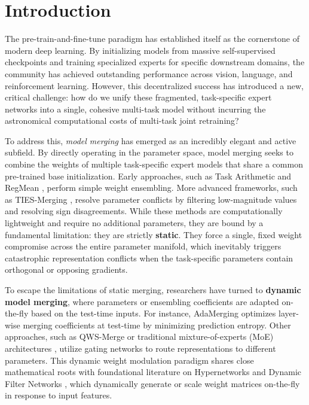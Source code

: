 \section{Introduction}
\label{sec:intro}

The pre-train-and-fine-tune paradigm has established itself as the cornerstone of modern deep learning. By initializing models from massive self-supervised checkpoints and training specialized experts for specific downstream domains, the community has achieved outstanding performance across vision, language, and reinforcement learning. However, this decentralized success has introduced a new, critical challenge: how do we unify these fragmented, task-specific expert networks into a single, cohesive multi-task model without incurring the astronomical computational costs of multi-task joint retraining?

To address this, \emph{model merging} has emerged as an incredibly elegant and active subfield. By directly operating in the parameter space, model merging seeks to combine the weights of multiple task-specific expert models that share a common pre-trained base initialization. Early approaches, such as Task Arithmetic \cite{task_arithmetic} and RegMean \cite{regmean}, perform simple weight ensembling. More advanced frameworks, such as TIES-Merging \cite{ties}, resolve parameter conflicts by filtering low-magnitude values and resolving sign disagreements. While these methods are computationally lightweight and require no additional parameters, they are bound by a fundamental limitation: they are strictly \textbf{static}. They force a single, fixed weight compromise across the entire parameter manifold, which inevitably triggers catastrophic representation conflicts when the task-specific parameters contain orthogonal or opposing gradients.

To escape the limitations of static merging, researchers have turned to \textbf{dynamic model merging}, where parameters or ensembling coefficients are adapted on-the-fly based on the test-time inputs. For instance, AdaMerging \cite{adamerging} optimizes layer-wise merging coefficients at test-time by minimizing prediction entropy. Other approaches, such as QWS-Merge \cite{qws_merge} or traditional mixture-of-experts (MoE) architectures \cite{shazeer2017outrageously, fedus2022switch}, utilize gating networks to route representations to different parameters. This dynamic weight modulation paradigm shares close mathematical roots with foundational literature on Hypernetworks \cite{ha2016hypernetworks} and Dynamic Filter Networks \cite{jia2016dynamic}, which dynamically generate or scale weight matrices on-the-fly in response to input features. 

